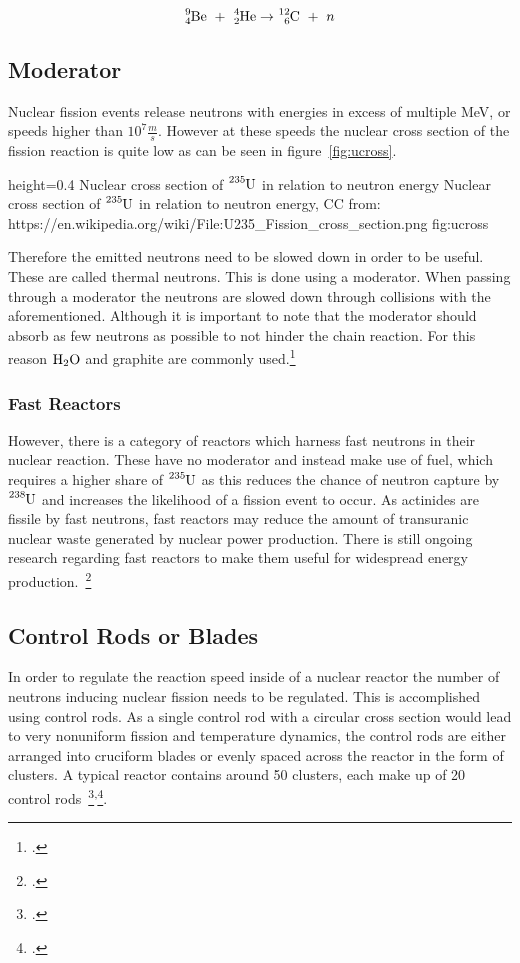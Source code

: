 \begin{equation}
    \label{neut}
    \ce{^{9}_{4}Be} ~+~ \ce{^{4}_{2}He} \rightarrow \ce{^{12}_{6}C} ~+~ n
\end{equation}

\pagebreak
\subsection{Moderator}
Nuclear fission events release neutrons with energies in excess of multiple MeV, or speeds higher
than $10^{7} \frac{m}{s}$. However at these speeds the nuclear cross section of the fission reaction
is quite low as can be seen in figure~\ref{fig:ucross}.

  {height=0.4\textheight}%
  {Nuclear cross section of $\ce{^{235}U}$ in relation to neutron energy}%
  {Nuclear cross section of $\ce{^{235}U}$ in relation to neutron energy, CC from: https://en.wikipedia.org/wiki/File:U235\_Fission\_cross\_section.png}%
  {fig:ucross}%

  Therefore the emitted neutrons need to be slowed down in order to be useful. These are called thermal neutrons.
  This is done using a moderator. When passing through a moderator the neutrons are slowed down through
  collisions with the aforementioned. Although it is important to note that the moderator should absorb
  as few neutrons as possible to not hinder the chain reaction. For this reason $\ce{H_{2}O}$ 
  and graphite are commonly used.\footcite[28]{ReactorPhysics}
\subsubsection{Fast Reactors}
However, there is a category of reactors which harness fast neutrons in their nuclear reaction.
These have no moderator and instead make use of fuel, which requires a higher share of $\ce{^{235}U}$
as this reduces the chance of neutron capture by $\ce{^{238}U}$ and increases the likelihood of a fission event to occur.
As actinides are fissile by fast neutrons, fast reactors may reduce the amount of transuranic nuclear waste
generated by nuclear power production. There is still ongoing research regarding fast reactors to make
them useful for widespread energy production.~\footcite{WNPR}


\subsection{Control Rods or Blades}
In order to regulate the reaction speed inside of a nuclear reactor the number of neutrons inducing
nuclear fission needs to be regulated. This is accomplished using control rods.
As a single control rod with a circular cross section would lead to very nonuniform fission and
temperature dynamics, the control rods are either arranged into cruciform blades or evenly spaced
across the reactor in the form of clusters. A typical reactor contains around 50 clusters, each
make up of 20 control rods~\footcite[72]{ReactorPhysics}\textsuperscript{,}\footcite{grayson}.

